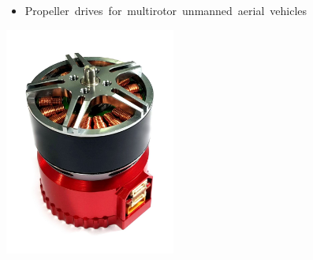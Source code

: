 \documentclass{document_templates/documentation_template_latex/zubaxdoc}
\begin{document}
\begin{titlepage}
\begin{itemize}
    \item \mbox{Propeller drives for multirotor unmanned aerial vehicles}
\end{itemize}

\centering
\includegraphics[width=0.42\textwidth]{sadulli_grosso_pic}
\end{titlepage}

\tableofcontents
\BeginRightColumn
\listoffigures
\listoftables

\mainmatter






\end{document}
